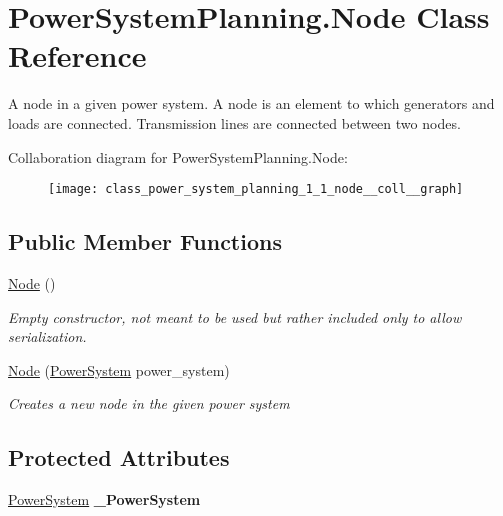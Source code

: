 \hypertarget{class_power_system_planning_1_1_node}{}\section{Power\+System\+Planning.\+Node Class Reference}
\label{class_power_system_planning_1_1_node}


A node in a given power system. A node is an element to which generators and loads are connected. Transmission lines are connected between two nodes.  




Collaboration diagram for Power\+System\+Planning.\+Node\+:\nopagebreak
\begin{figure}[H]
\begin{center}
\leavevmode
\texttt{[image: class\_power\_system\_planning\_1\_1\_node\_\_coll\_\_graph]}
\end{center}
\end{figure}
\subsection*{Public Member Functions}
\begin{DoxyCompactItemize}
\item 
\hyperlink{class_power_system_planning_1_1_node_a7c7b4c8b9e85f023e7cc2c4ea9548bcc}{Node} ()
\begin{DoxyCompactList}\small\item\em Empty constructor, not meant to be used but rather included only to allow serialization. \end{DoxyCompactList}\item 
\hyperlink{class_power_system_planning_1_1_node_ae780d904bb5294448298e5537c747ff2}{Node} (\hyperlink{class_power_system_planning_1_1_power_system}{Power\+System} power\+\_\+system)
\begin{DoxyCompactList}\small\item\em Creates a new node in the given power system \end{DoxyCompactList}\end{DoxyCompactItemize}
\subsection*{Protected Attributes}
\begin{DoxyCompactItemize}
\item 
\hyperlink{class_power_system_planning_1_1_power_system}{Power\+System} {\bfseries \+\_\+\+Power\+System}\hypertarget{class_power_system_planning_1_1_node_acc4b86b1144ad6c954c6b2b2b1d02d4e}{}\label{class_power_system_planning_1_1_node_acc4b86b1144ad6c954c6b2b2b1d02d4e}

\end{DoxyCompactItemize}
